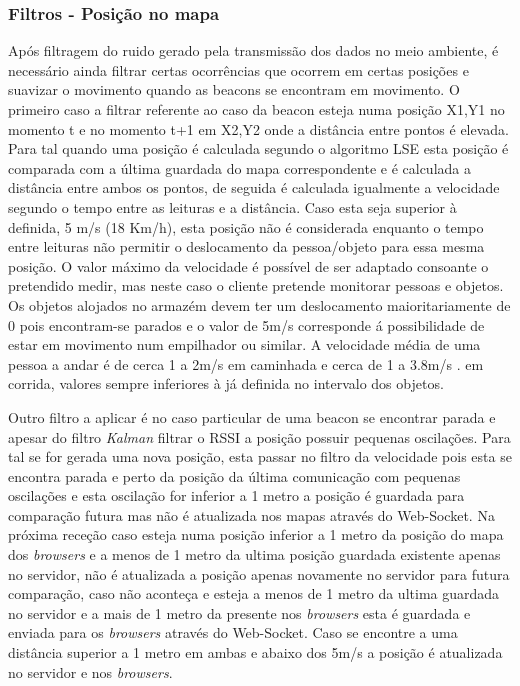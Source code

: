 \subsubsection{Filtros - Posição no mapa}

\par Após filtragem do ruido gerado pela transmissão dos dados no meio ambiente, é necessário ainda filtrar certas ocorrências que ocorrem em certas posições e suavizar o movimento quando as beacons se encontram em movimento. O primeiro caso a filtrar referente ao caso da beacon esteja numa posição X1,Y1 no momento t e no momento t+1 em X2,Y2 onde a distância entre pontos é elevada. Para tal quando uma posição é calculada segundo o algoritmo LSE esta posição é comparada com a última guardada do mapa correspondente e é calculada a distância entre ambos os pontos, de seguida é calculada igualmente a velocidade segundo o tempo entre as leituras e a distância. Caso esta seja superior à definida, 5 m/s (18 Km/h), esta posição não é considerada enquanto o tempo entre leituras não permitir o deslocamento da pessoa/objeto para essa mesma posição. O valor máximo da velocidade é possível de ser adaptado consoante o pretendido medir, mas neste caso o cliente pretende monitorar pessoas e objetos. Os objetos alojados no armazém devem ter um deslocamento maioritariamente de 0 pois encontram-se parados e o valor de 5m/s corresponde á possibilidade de estar em movimento num empilhador ou similar. A velocidade média de uma pessoa a andar é de cerca 1 a 2m/s em caminhada\cite{walkingSpeed} e cerca de 1 a 3.8m/s \cite{Long2013}. em corrida, valores sempre inferiores à já definida no intervalo dos objetos.
\par Outro filtro a aplicar é no caso particular de uma beacon se encontrar parada e apesar do filtro \textit{Kalman} filtrar o RSSI a posição possuir pequenas oscilações. Para tal se for gerada uma nova posição, esta passar no filtro da velocidade pois esta se encontra parada e perto da posição da última comunicação com pequenas oscilações e esta oscilação for inferior a 1 metro a posição é guardada para comparação futura mas não é atualizada nos mapas através do Web-Socket. Na próxima receção caso esteja numa posição inferior a 1 metro da posição do mapa dos \textit{browsers} e a menos de 1 metro da ultima posição guardada existente apenas no servidor, não é atualizada a posição apenas novamente no servidor para futura comparação, caso não aconteça e esteja a menos de 1 metro da ultima guardada no servidor e a mais de 1 metro da presente nos \textit{browsers} esta é guardada e enviada para os \textit{browsers} através do Web-Socket. Caso se encontre a uma distância superior a 1 metro em ambas e abaixo dos 5m/s a posição é atualizada no servidor e nos \textit{browsers}.

